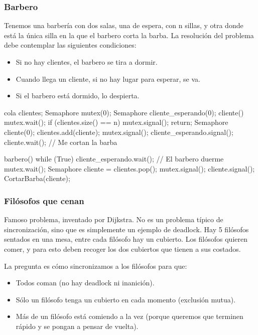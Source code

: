 \documentclass{article}
\begin{document}
\subsubsection{Barbero}

Tenemos una barbería con dos salas, una de espera, con n sillas, y otra donde está la única silla en la que el barbero corta la barba. La resolución del problema debe contemplar las siguientes condiciones:

\begin{itemize}
 \item Si no hay clientes, el barbero se tira a dormir.
 \item Cuando llega un cliente, si no hay lugar para esperar, se va.
 \item Si el barbero está dormido, lo despierta.
\end{itemize}


\begin{code}
cola clientes;
Semaphore mutex(0);
Semaphore cliente_esperando(0);
cliente() {
    mutex.wait();
    if (clientes.size() == n) {
        mutex.signal();
        return;
    }
    Semaphore cliente(0);
    clientes.add(cliente);
    mutex.signal();
    cliente_esperando.signal();
    cliente.wait();
    // Me cortan la barba
}

barbero() {
    while (True) {
        cliente_esperando.wait(); // El barbero duerme
        mutex.wait();
        Semaphore cliente = clientes.pop();
        mutex.signal();
        cliente.signal();
        CortarBarba(cliente);
    }
}
\end{code}

\subsubsection{Filósofos que cenan}

Famoso problema, inventado por Dijkstra. No es un problema típico de sincronización, sino que es simplemente un ejemplo de deadlock. Hay 5 filósofos sentados en una mesa, entre cada filósofo hay un cubierto. Los filósofos quieren comer, y para esto deben recoger los dos cubiertos que tienen a sus costados.

La pregunta es cómo sincronizamos a los filósofos para que:
\begin{itemize}
 \item Todos coman (no hay deadlock ni inanición).
 \item Sólo un filósofo tenga un cubierto en cada momento (exclusión mutua).
 \item Más de un filósofo está comiendo a la vez (porque queremos que terminen rápido y se pongan a pensar de vuelta).
\end{itemize}
\end{document}

